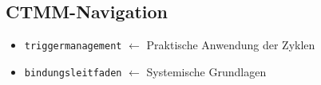 \subsection*{\textcolor{ctmmBlue}{CTMM-Navigation}}
\begin{itemize}
  \item \texttt{triggermanagement} $\leftarrow$ Praktische Anwendung der Zyklen
  \item \texttt{bindungsleitfaden} $\leftarrow$ Systemische Grundlagen
\end{itemize}
